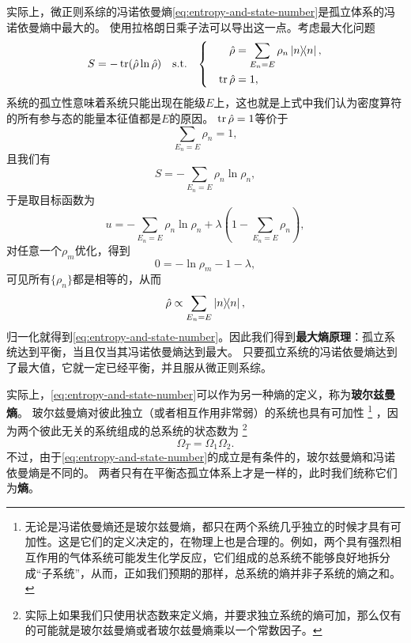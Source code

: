\documentclass[hyperref, UTF8, a4paper]{ctexart}
\newenvironment{bigcase}{\left\{\quad\begin{aligned}}{\end{aligned}\right.}
\begin{document}
实际上，微正则系综的冯诺依曼熵\eqref{eq:entropy-and-state-number}是孤立体系的冯诺依曼熵中最大的。
使用拉格朗日乘子法可以导出这一点。考虑最大化问题
\[
    S = - \trace (\hat{\rho} \ln \hat{\rho}) \quad \text{s.t.} \quad \begin{bigcase}
        \hat{\rho} &= \sum_{E_n=E} \rho_n \dyad{n}, \\
        \trace \hat{\rho} &= 1,
    \end{bigcase}
\]
系统的孤立性意味着系统只能出现在能级$E$上，这也就是上式中我们认为密度算符的所有参与态的能量本征值都是$E$的原因。
$\trace \hat{\rho} = 1$等价于
\[
    \sum_{E_n=E} \rho_n = 1,
\]
且我们有
\[
    S = - \sum_{E_n=E} \rho_n \ln \rho_n,
\]
于是取目标函数为
\[
    u = - \sum_{E_n=E} \rho_n \ln \rho_n + \lambda \left(1 - \sum_{E_n=E} \rho_n\right),
\]
对任意一个$\rho_m$优化，得到
\[
    0 = - \ln \rho_m - 1 - \lambda,
\]
可见所有$\{\rho_n\}$都是相等的，从而
\[
    \hat{\rho} \propto \sum_{E_n=E} \dyad{n},
\]
归一化就得到\eqref{eq:entropy-and-state-number}。因此我们得到\textbf{最大熵原理}：孤立系统达到平衡，当且仅当其冯诺依曼熵达到最大。
只要孤立系统的冯诺依曼熵达到了最大值，它就一定已经平衡，并且服从微正则系综。

实际上，\eqref{eq:entropy-and-state-number}可以作为另一种熵的定义，称为\textbf{玻尔兹曼熵}。
玻尔兹曼熵对彼此独立（或者相互作用非常弱）的系统也具有可加性%
\footnote{无论是冯诺依曼熵还是玻尔兹曼熵，都只在两个系统几乎独立的时候才具有可加性。这是它们的定义决定的，在物理上也是合理的。例如，两个具有强烈相互作用的气体系统可能发生化学反应，它们组成的总系统不能够良好地拆分成“子系统”，从而，正如我们预期的那样，总系统的熵并非子系统的熵之和。}%
，因为两个彼此无关的系统组成的总系统的状态数为%
\footnote{实际上如果我们只使用状态数来定义熵，并要求独立系统的熵可加，那么仅有的可能就是玻尔兹曼熵或者玻尔兹曼熵乘以一个常数因子。}%
\begin{equation}
    \Omega_T = \Omega_1 \Omega_2.
\end{equation}
不过，由于\eqref{eq:entropy-and-state-number}的成立是有条件的，玻尔兹曼熵和冯诺依曼熵是不同的。
两者只有在平衡态孤立体系上才是一样的，此时我们统称它们为\textbf{熵}。
\end{document}
